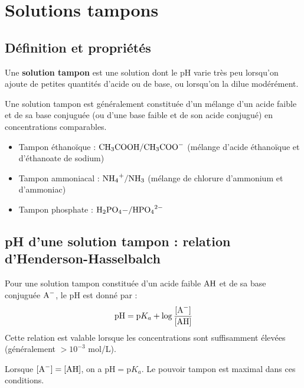 \section{Solutions tampons}

\subsection{Définition et propriétés}

\begin{definition}
Une \textbf{solution tampon} est une solution dont le pH varie très peu lorsqu'on ajoute de petites quantités d'acide ou de base, ou lorsqu'on la dilue modérément.
\end{definition}

\begin{propriete}
Une solution tampon est généralement constituée d'un mélange d'un acide faible et de sa base conjuguée (ou d'une base faible et de son acide conjugué) en concentrations comparables.
\end{propriete}

\begin{exemple}
\begin{itemize}
    \item Tampon éthanoïque : $\ce{CH3COOH/CH3COO-}$ (mélange d'acide éthanoïque et d'éthanoate de sodium)
    \item Tampon ammoniacal : $\ce{NH4+/NH3}$ (mélange de chlorure d'ammonium et d'ammoniac)
    \item Tampon phosphate : $\ce{H2PO4-/HPO4^2-}$
\end{itemize}
\end{exemple}

\subsection{pH d'une solution tampon : relation d'Henderson-Hasselbalch}

\begin{loi}
Pour une solution tampon constituée d'un acide faible $\ce{AH}$ et de sa base conjuguée $\ce{A-}$, le pH est donné par :
\[\mathrm{pH} = \mathrm{p}K_a + \log\frac{[\ce{A-}]}{[\ce{AH}]}\]
Cette relation est valable lorsque les concentrations sont suffisamment élevées (généralement $> 10^{-3}$ mol/L).
\end{loi}

\begin{propriete}
Lorsque $[\ce{A-}] = [\ce{AH}]$, on a $\mathrm{pH} = \mathrm{p}K_a$. Le pouvoir tampon est maximal dans ces conditions.
\end{propriete}

